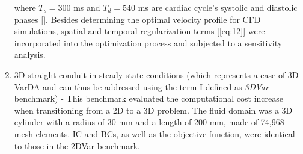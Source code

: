 \begin{enumerate}
where \( T_s = 300 \) ms and \( T_d = 540 \) ms are cardiac cycle's systolic and diastolic phases [\cite{Katz1977}]. Besides determining the optimal velocity profile for CFD simulations, spatial and temporal regularization terms [\cref{eq:12}] were incorporated into the optimization process and subjected to a sensitivity analysis.\\
%
%
    \item 3D straight conduit in steady-state conditions (which represents a case of 3D VarDA and can thus be addressed using the term I defined as \emph{3DVar} benchmark) - This benchmark evaluated the computational cost increase when transitioning from a 2D to a 3D problem. The fluid domain was a 3D cylinder with a radius of 30 mm and a length of 200 mm, made of 74,968 mesh elements. IC and BCs, as well as the objective function, were identical to those in the 2DVar benchmark.

\end{enumerate}
